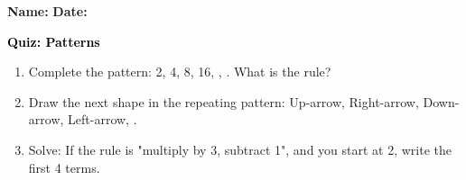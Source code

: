 \documentclass[12pt, letterpaper, fleqn]{article}
\newcommand{\blank}{\underline{\hspace{2.2cm}}}
\begin{document}
\textbf{Name:} \underline{\hspace{5cm}}
\hfill
\textbf{Date:} \underline{\hspace{3cm}}\\

\begin{tcolorbox}[colback=customteal!20]
    \large\textcolor{black}{\textbf{Quiz: Patterns}}
\end{tcolorbox}
\begin{enumerate}[itemsep=3.5cm, leftmargin=0.6cm]
\item Complete the pattern: 2, 4, 8, 16, \blank, \blank. What is the rule?
\vspace{3cm}
\item Draw the next shape in the repeating pattern: Up-arrow, Right-arrow, Down-arrow, Left-arrow, \blank.
\vspace{3cm}
\item Solve: If the rule is "multiply by 3, subtract 1", and you start at 2, write the first 4 terms.
\end{enumerate}
\end{document}
